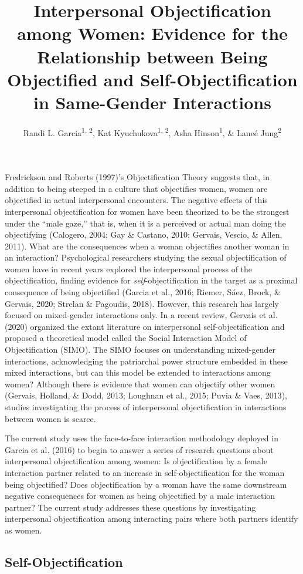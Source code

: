 \documentclass[man]{apa6}
\title{Interpersonal Objectification among Women: Evidence for the Relationship
between Being Objectified and Self-Objectification in Same-Gender
Interactions}
\author{Randi L. Garcia\textsuperscript{1, 2}, Kat
Kyuchukova\textsuperscript{1, 2}, Asha Hinson\textsuperscript{1}, \&
Laneé Jung\textsuperscript{2}}
\date{}
\affiliation{
\vspace{0.5cm}
\textsuperscript{1} Department of Psychology, Smith College\\\textsuperscript{2} Program in Statistical and Data Sciences, Smith College}
\begin{document}
\maketitle

Fredrickson and Roberts (1997)'s Objectification Theory suggests that,
in addition to being steeped in a culture that objectifies women, women
are objectified in actual interpersonal encounters. The negative effects
of this interpersonal objectification for women have been theorized to
be the strongest under the \enquote{male gaze,} that is, when it is a
perceived or actual man doing the objectifying (Calogero, 2004; Gay \&
Castano, 2010; Gervais, Vescio, \& Allen, 2011). What are the
consequences when a woman objectifies another woman in an interaction?
Psychological researchers studying the sexual objectification of women
have in recent years explored the interpersonal process of the
objectification, finding evidence for \emph{self}-objectification in the
target as a proximal consequence of being objectified (Garcia et al.,
2016; Riemer, Sáez, Brock, \& Gervais, 2020; Strelan \& Pagoudis, 2018).
However, this research has largely focused on mixed-gender interactions
only. In a recent review, Gervais et al. (2020) organized the extant
literature on interpersonal self-objectification and proposed a
theoretical model called the Social Interaction Model of Objectification
(SIMO). The SIMO focuses on understanding mixed-gender interactions,
acknowledging the patriarchal power structure embedded in these mixed
interactions, but can this model be extended to interactions among
women? Although there is evidence that women can objectify other women
(Gervais, Holland, \& Dodd, 2013; Loughnan et al., 2015; Puvia \& Vaes,
2013), studies investigating the process of interpersonal
objectification in interactions between women is scarce.

The current study uses the face-to-face interaction methodology deployed
in Garcia et al. (2016) to begin to answer a series of research
questions about interpersonal objectification among women: Is
objectification by a female interaction partner related to an increase
in self-objectification for the woman being objectified? Does
objectification by a woman have the same downstream negative
consequences for women as being objectified by a male interaction
partner? The current study addresses these questions by investigating
interpersonal objectification among interacting pairs where both
partners identify as women.

\subsection{Self-Objectification}\label{self-objectification}
\end{document}
